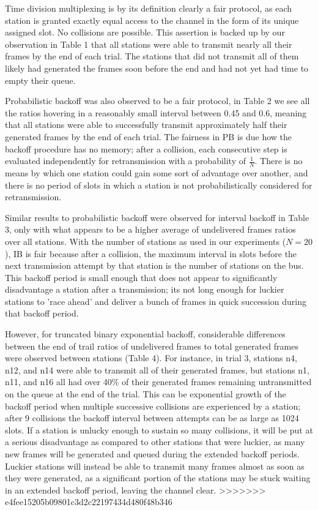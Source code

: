 \documentclass[twocolumn]{article}
\begin{document}
Time division multiplexing is by its definition clearly a fair protocol, as each station is 
granted exactly equal access to the channel in the form of its unique assigned slot. No 
collisions are possible. This assertion is backed up by our observation in Table 1 that 
all stations were able to transmit nearly all their frames by the end of each trial. The 
stations that did not transmit all of them likely had generated the frames soon before the 
end and had not yet had time to empty their queue.

Probabilistic backoff was also observed to be a fair protocol, in Table 2 we see all the 
ratios hovering in a reasonably small interval between 0.45 and 0.6, meaning that all stations
were able to successfully transmit approximately half their generated frames by the end of each
trial. The fairness in PB is due how the backoff procedure has no memory; after a collision,
each consecutive step is evaluated independently for retransmission with a probability of 
$\frac{1}{N}$. There is no means by which one station could gain some sort of advantage over
another, and there is no period of slots in which a station is not probabilistically considered
for retransmission.

Similar results to probabilistic backoff were observed for interval backoff in Table 3, only 
with what appears to be a higher average of undelivered frames ratios over all stations. With
the number of stations as used in our experiments ($N=20$), IB is fair because
after a collision, the maximum interval in slots before the next transmission
attempt by that station is the number of stations on the bus. This backoff period is 
small enough that does not appear to significantly disadvantage a station after a transmission;
its not long enough for luckier stations to 'race ahead' and deliver a bunch of frames in 
quick succession during that backoff period.

However, for truncated binary exponential backoff, considerable differences
between the end of trail ratios of undelivered frames to total generated frames
were observed between stations (Table 4). For instance, in trial 3, stations n4,
n12, and n14 were able to transmit all of their generated frames, but stations
n1, n11, and n16 all had over 40\% of their generated frames remaining
untransmitted on the queue at the end of the trial. This can be exponential
growth of the backoff period when multiple successive collisions are experienced
by a station; after 9 collisions the backoff interval between attempts can be as
large as 1024 slots. If a station is unlucky enough to sustain so many
collisions, it will be put at a serious disadvantage as compared to other
stations that were luckier, as many new frames will be generated and queued
during the extended backoff periods. Luckier stations will instead be able to transmit many
frames almost as soon as they were generated, as a significant portion of the stations
may be stuck waiting in an extended backoff period, leaving the channel clear.
>>>>>>> e4fee15205b09801c3d2c22197434d480f48b346
\end{document}
